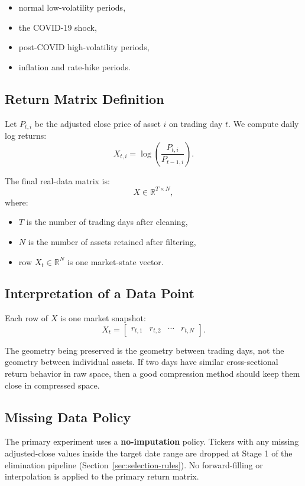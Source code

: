 \documentclass[11pt]{article}
\begin{document}
\begin{itemize}
    \item normal low-volatility periods,
    \item the COVID-19 shock,
    \item post-COVID high-volatility periods,
    \item inflation and rate-hike periods.
\end{itemize}

\subsection{Return Matrix Definition}

Let $P_{t,i}$ be the adjusted close price of asset $i$ on trading day $t$. We compute daily log returns:
\[
X_{t,i} = \log \left( \frac{P_{t,i}}{P_{t-1,i}} \right).
\]

The final real-data matrix is:
\[
X \in \mathbb{R}^{T \times N},
\]
where:

\begin{itemize}
    \item $T$ is the number of trading days after cleaning,
    \item $N$ is the number of assets retained after filtering,
    \item row $X_t \in \mathbb{R}^N$ is one market-state vector.
\end{itemize}

\subsection{Interpretation of a Data Point}

Each row of $X$ is one market snapshot:
\[
X_t =
\begin{bmatrix}
r_{t,1} & r_{t,2} & \cdots & r_{t,N}
\end{bmatrix}.
\]

The geometry being preserved is the geometry between trading days, not the geometry between individual assets. If two days have similar cross-sectional return behavior in raw space, then a good compression method should keep them close in compressed space.

\subsection{Missing Data Policy}\label{sec:missing-data}

The primary experiment uses a \textbf{no-imputation} policy. Tickers with any missing adjusted-close values inside the target date range are dropped at Stage 1 of the elimination pipeline (Section~\ref{sec:selection-rules}). No forward-filling or interpolation is applied to the primary return matrix.
\end{document}
